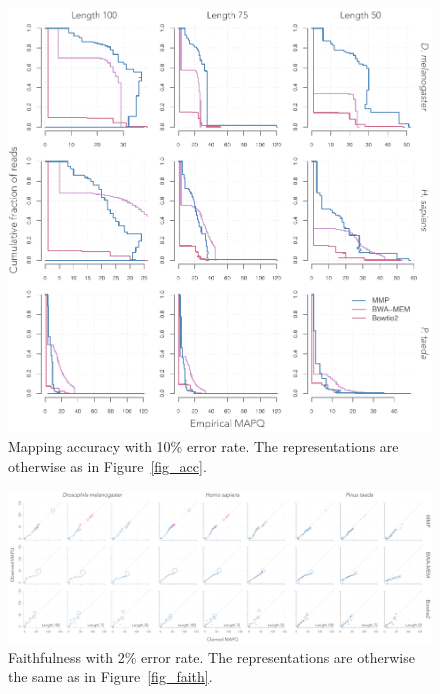\documentclass[a4,center,fleqn]{NAR}
\begin{document}
\begin{figure}
\begin{center}
\includegraphics[scale=.54]{accQ10_fig.pdf}
\end{center}
\caption{Mapping accuracy with 10\% error rate. The representations are
otherwise as in Figure~\ref{fig_acc}.}
\end{figure}

\clearpage

\begin{figure}[t]
\begin{center}
\includegraphics[scale=.24]{faith_Q2.pdf}
\end{center}
\caption{Faithfulness with 2\% error rate. The representations are
otherwise the same as in Figure~\ref{fig_faith}.}
\end{figure}
\end{document}
